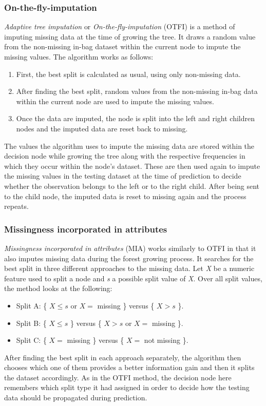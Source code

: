 \documentclass[11pt]{article}
\begin{document}
      \subsubsection{On-the-fly-imputation}
        {\it Adaptive tree imputation} \citep{rsf} or {\it On-the-fly-imputation} \citep{otfi} (OTFI) is a method of imputing missing data at the time of growing the tree. It draws a random value from the non-missing in-bag dataset within the current node to impute the missing values. The algorithm works as follows: 
        \begin{enumerate}
        \item First, the best split is calculated as usual, using only non-missing data.
        \item After finding the best split, random values from the non-missing in-bag data within the current node are used to impute the missing values.
        \item Once the data are imputed, the node is split into the left and right children nodes and the imputed data are reset back to missing.
        \end{enumerate}
        The values the algorithm uses to impute the missing data are stored within the decision node while growing the tree along with the respective frequencies in which they occur within the node's dataset. These are then used again to impute the missing values in the testing dataset at the time of prediction to decide whether the observation belongs to the left or to the right child. After being sent to the child node, the imputed data is reset to missing again and the process repeats.
      \subsubsection{Missingness incorporated in attributes}
        {\it Missingness incorporated in attributes} \citep{mia} (MIA) works similarly to OTFI in that it also imputes missing data during the forest growing process. It searches for the best split in three different approaches to the missing data. Let {\it X} be a numeric feature used to split a node and {\it s} a possible split value of {\it X}. Over all split values, the method looks at the following:
        \begin{itemize}
        \item Split A: \{ $X \leq s$ or $X =$ missing \} versus \{ $X > s$ \}.
        \item Split B: \{ $X \leq s$ \} versus \{ $X > s$ or $X =$ missing \}.
        \item Split C: \{ $X =$ missing \} versus \{ $X =$ not missing \}.
        \end{itemize}
        After finding the best split in each approach separately, the algorithm then chooses which one of them provides a better information gain and then it splits the dataset accordingly. As in the OTFI method, the decision node here remembers which split type it had assigned in order to decide how the testing data should be propagated during prediction.
\end{document}
